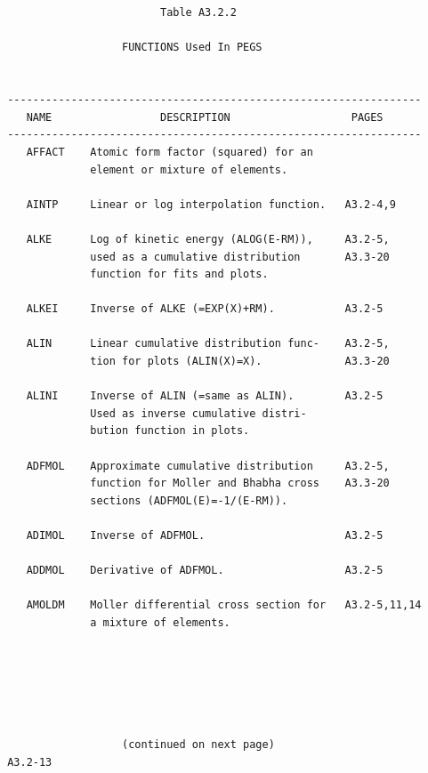 \newpage  {} \begin{verbatim}


                         Table A3.2.2

                   FUNCTIONS Used In PEGS


 -----------------------------------------------------------------
    NAME                 DESCRIPTION                   PAGES
 -----------------------------------------------------------------
    AFFACT    Atomic form factor (squared) for an
              element or mixture of elements.

    AINTP     Linear or log interpolation function.   A3.2-4,9

    ALKE      Log of kinetic energy (ALOG(E-RM)),     A3.2-5,
              used as a cumulative distribution       A3.3-20
              function for fits and plots.

    ALKEI     Inverse of ALKE (=EXP(X)+RM).           A3.2-5

    ALIN      Linear cumulative distribution func-    A3.2-5,
              tion for plots (ALIN(X)=X).             A3.3-20

    ALINI     Inverse of ALIN (=same as ALIN).        A3.2-5
              Used as inverse cumulative distri-
              bution function in plots.

    ADFMOL    Approximate cumulative distribution     A3.2-5,
              function for Moller and Bhabha cross    A3.3-20
              sections (ADFMOL(E)=-1/(E-RM)).

    ADIMOL    Inverse of ADFMOL.                      A3.2-5

    ADDMOL    Derivative of ADFMOL.                   A3.2-5

    AMOLDM    Moller differential cross section for   A3.2-5,11,14
              a mixture of elements.






                   (continued on next page)
 A3.2-13
\end{verbatim}
